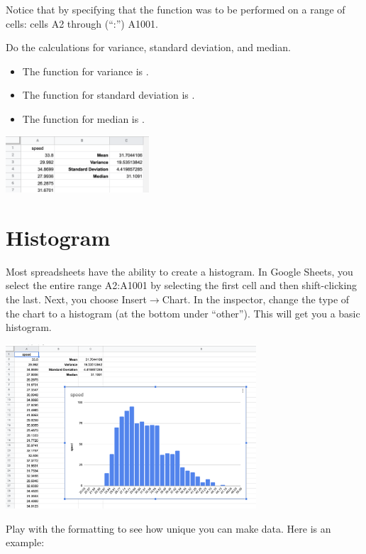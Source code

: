 Notice that by specifying that the function  was to
be performed on a range of cells: cells A2 through (``:'') A1001.

Do the calculations for variance, standard deviation, and median.

\begin{itemize}
\item The function for variance is .
\item The function for standard deviation is .
\item The function for median is .
\end{itemize}

\includegraphics[width=0.4\textwidth]{var_stdev_median.png}

\section{Histogram}

Most spreadsheets have the ability to create a histogram. In Google
Sheets, you select the entire range A2:A1001 by selecting the first
cell and then shift-clicking the last. Next, you choose
Insert$\rightarrow$Chart. In the inspector, change the type of the
chart to a histogram (at the bottom under ``other''). This will get you a basic histogram.

\includegraphics[width=0.7\textwidth]{default_histogram.png}

Play with the formatting to see how unique you can make data. Here is an example:

